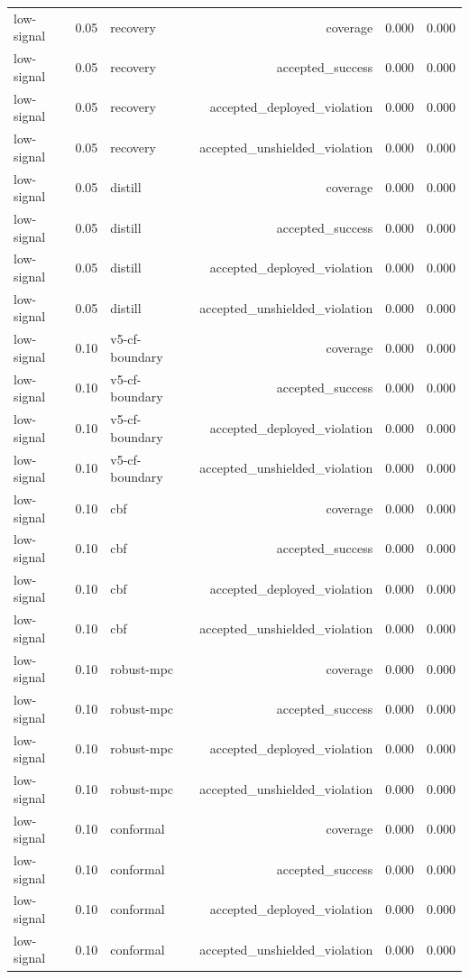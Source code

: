 \documentclass{article}
\begin{document}
\begin{longtable}{@{}lllrrr@{}}
low-signal & 0.05 & recovery & coverage & 0.000 & 0.000 \\
low-signal & 0.05 & recovery & accepted\_success & 0.000 & 0.000 \\
low-signal & 0.05 & recovery & accepted\_deployed\_violation & 0.000 & 0.000 \\
low-signal & 0.05 & recovery & accepted\_unshielded\_violation & 0.000 & 0.000 \\
low-signal & 0.05 & distill & coverage & 0.000 & 0.000 \\
low-signal & 0.05 & distill & accepted\_success & 0.000 & 0.000 \\
low-signal & 0.05 & distill & accepted\_deployed\_violation & 0.000 & 0.000 \\
low-signal & 0.05 & distill & accepted\_unshielded\_violation & 0.000 & 0.000 \\
low-signal & 0.10 & v5-cf-boundary & coverage & 0.000 & 0.000 \\
low-signal & 0.10 & v5-cf-boundary & accepted\_success & 0.000 & 0.000 \\
low-signal & 0.10 & v5-cf-boundary & accepted\_deployed\_violation & 0.000 & 0.000 \\
low-signal & 0.10 & v5-cf-boundary & accepted\_unshielded\_violation & 0.000 & 0.000 \\
low-signal & 0.10 & cbf & coverage & 0.000 & 0.000 \\
low-signal & 0.10 & cbf & accepted\_success & 0.000 & 0.000 \\
low-signal & 0.10 & cbf & accepted\_deployed\_violation & 0.000 & 0.000 \\
low-signal & 0.10 & cbf & accepted\_unshielded\_violation & 0.000 & 0.000 \\
low-signal & 0.10 & robust-mpc & coverage & 0.000 & 0.000 \\
low-signal & 0.10 & robust-mpc & accepted\_success & 0.000 & 0.000 \\
low-signal & 0.10 & robust-mpc & accepted\_deployed\_violation & 0.000 & 0.000 \\
low-signal & 0.10 & robust-mpc & accepted\_unshielded\_violation & 0.000 & 0.000 \\
low-signal & 0.10 & conformal & coverage & 0.000 & 0.000 \\
low-signal & 0.10 & conformal & accepted\_success & 0.000 & 0.000 \\
low-signal & 0.10 & conformal & accepted\_deployed\_violation & 0.000 & 0.000 \\
low-signal & 0.10 & conformal & accepted\_unshielded\_violation & 0.000 & 0.000 \\

\end{longtable}
\end{document}

